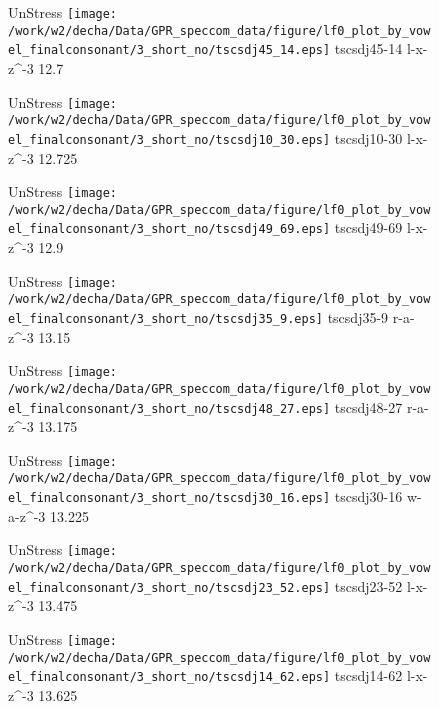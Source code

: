 \documentclass{article}
\begin{document}
\begin{figure}[t]
\begin{minipage}[b]{.24\textwidth}
UnStress
\centering
\texttt{[image: /work/w2/decha/Data/GPR\_speccom\_data/figure/lf0\_plot\_by\_vowel\_finalconsonant/3\_short\_no/tscsdj45\_14.eps]}
tscsdj45-14 l-x-z\textasciicircum-3 12.7
\end{minipage}
\begin{minipage}[b]{.24\textwidth}
UnStress
\centering
\texttt{[image: /work/w2/decha/Data/GPR\_speccom\_data/figure/lf0\_plot\_by\_vowel\_finalconsonant/3\_short\_no/tscsdj10\_30.eps]}
tscsdj10-30 l-x-z\textasciicircum-3 12.725
\end{minipage}
\begin{minipage}[b]{.24\textwidth}
UnStress
\centering
\texttt{[image: /work/w2/decha/Data/GPR\_speccom\_data/figure/lf0\_plot\_by\_vowel\_finalconsonant/3\_short\_no/tscsdj49\_69.eps]}
tscsdj49-69 l-x-z\textasciicircum-3 12.9
\end{minipage}
\begin{minipage}[b]{.24\textwidth}
UnStress
\centering
\texttt{[image: /work/w2/decha/Data/GPR\_speccom\_data/figure/lf0\_plot\_by\_vowel\_finalconsonant/3\_short\_no/tscsdj35\_9.eps]}
tscsdj35-9 r-a-z\textasciicircum-3 13.15
\end{minipage}
\end{figure}

\begin{figure}[t]
\begin{minipage}[b]{.24\textwidth}
UnStress
\centering
\texttt{[image: /work/w2/decha/Data/GPR\_speccom\_data/figure/lf0\_plot\_by\_vowel\_finalconsonant/3\_short\_no/tscsdj48\_27.eps]}
tscsdj48-27 r-a-z\textasciicircum-3 13.175
\end{minipage}
\begin{minipage}[b]{.24\textwidth}
UnStress
\centering
\texttt{[image: /work/w2/decha/Data/GPR\_speccom\_data/figure/lf0\_plot\_by\_vowel\_finalconsonant/3\_short\_no/tscsdj30\_16.eps]}
tscsdj30-16 w-a-z\textasciicircum-3 13.225
\end{minipage}
\begin{minipage}[b]{.24\textwidth}
UnStress
\centering
\texttt{[image: /work/w2/decha/Data/GPR\_speccom\_data/figure/lf0\_plot\_by\_vowel\_finalconsonant/3\_short\_no/tscsdj23\_52.eps]}
tscsdj23-52 l-x-z\textasciicircum-3 13.475
\end{minipage}
\begin{minipage}[b]{.24\textwidth}
UnStress
\centering
\texttt{[image: /work/w2/decha/Data/GPR\_speccom\_data/figure/lf0\_plot\_by\_vowel\_finalconsonant/3\_short\_no/tscsdj14\_62.eps]}
tscsdj14-62 l-x-z\textasciicircum-3 13.625
\end{minipage}
\end{figure}
\end{document}
